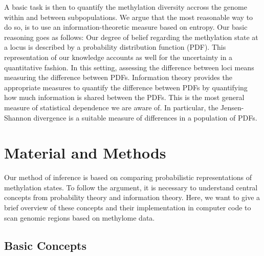 \documentclass[a4paper]{article}
\begin{document}
A basic task is then to quantify the methylation diversity accross the
genome within and between subpopulations. We argue that the most
reasonable way to do so, is to use an information-theoretic measure
based on entropy. Our basic reasoning goes as follows: Our degree of
belief regarding the methylation state at a locus is described by a
probability distribution function (PDF). This representation of our
knowledge accounts as well for the uncertainty in a quantitative
fashion. In this setting, assessing the difference between loci means
measuring the difference between PDFs. Information theory provides the
appropriate measures to quantify the difference between PDFs by
quantifying how much information is shared between the PDFs. This is
the most general measure of statistical dependence we are aware of. In
particular, the Jensen-Shannon divergence is a suitable measure of
differences in a population of PDFs.

\section{Material and Methods}
\label{sec:material-methods}

Our method of inference is based on comparing probabilistic
representations of methylation states. To follow the argument, it is
necessary to understand central concepts from probability theory and
information theory. Here, we want to give a brief overview of these
concepts and their implementation in computer code to scan genomic
regions based on methylome data.

\subsection{Basic Concepts}
\label{sec:basic-concepts}
\end{document}
